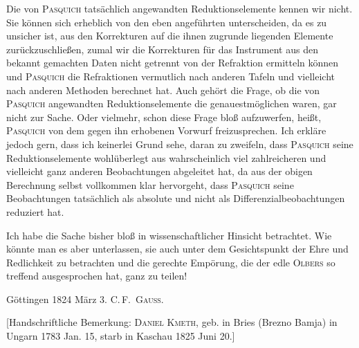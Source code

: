 Die von \textsc{Pasquich} tatsächlich angewandten Reduktionselemente kennen
wir nicht. Sie können sich erheblich von den eben angeführten unterscheiden,
da es zu unsicher ist, aus den Korrekturen auf  die ihnen
zugrunde liegenden Elemente zurückzuschließen, zumal wir die Korrekturen
für das Instrument aus den bekannt gemachten Daten nicht getrennt von der
Refraktion ermitteln können und \textsc{Pasquich} die Refraktionen vermutlich
nach anderen Tafeln und vielleicht nach anderen Methoden berechnet hat. Auch
gehört die Frage, ob die von \textsc{Pasquich} angewandten Reduktionselemente
die genauestmöglichen waren, gar nicht zur Sache. Oder vielmehr, schon diese
Frage bloß aufzuwerfen, heißt, \textsc{Pasquich} von dem gegen ihn erhobenen
Vorwurf freizusprechen. Ich erkläre jedoch gern, dass ich keinerlei Grund sehe,
daran zu zweifeln, dass \textsc{Pasquich} seine Reduktionselemente wohlüberlegt
aus wahrscheinlich viel zahlreicheren und vielleicht ganz anderen Beobachtungen
abgeleitet hat, da aus der obigen Berechnung selbst vollkommen klar hervorgeht,
dass \textsc{Pasquich} seine Beobachtungen tatsächlich als absolute und nicht
als Differenzialbeobachtungen reduziert hat.

Ich habe die Sache bisher bloß in wissenschaftlicher Hinsicht betrachtet.
Wie könnte man es aber unterlassen, sie auch unter dem Gesichtspunkt der Ehre
und Redlichkeit zu betrachten und die gerechte Empörung, die der edle
\textsc{Olbers} so treffend ausgesprochen hat, ganz zu teilen!

\noindent Göttingen 1824 März 3. \hfill C.\,F.\ \textsc{Gauss}.

[Handschriftliche Bemerkung: \textsc{Daniel Kmeth}, geb. in Bries (Brezno Bamja) in Ungarn 1783 Jan. 15, starb in Kaschau 1825 Juni 20.]
